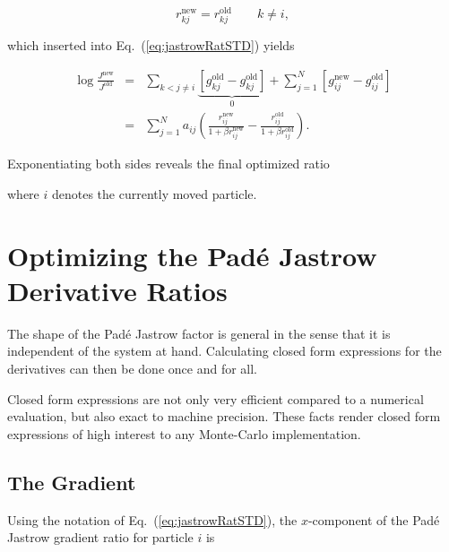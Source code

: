 \begin{equation}
 r^\mathrm{new}_{kj} = r^\mathrm{old}_{kj} \qquad k \ne i, 
\end{equation}

which inserted into Eq.~(\ref{eq:jastrowRatSTD}) yields

\begin{eqnarray}
  \log\frac{J^\mathrm{new}}{J^\mathrm{old}} &=& \sum_{k<j \ne i}  \underbrace{\left[g^\mathrm{old}_{kj} - g^\mathrm{old}_{kj}\right]}_{0} + \sum_{j = 1}^N \left[ g^\mathrm{new}_{ij} - g^\mathrm{old}_{ij}\right] \nonumber\\
                                            &=& \sum_{j = 1}^N a_{ij}\left(\frac{r^\mathrm{new}_{ij}}{1 + \beta r^\mathrm{new}_{ij}} - \frac{r^\mathrm{old}_{ij}}{1 + \beta r^\mathrm{old}_{ij}}\right).
\end{eqnarray}

Exponentiating both sides reveals the final optimized ratio 


where $i$ denotes the currently moved particle.

\section{Optimizing the Padé Jastrow Derivative Ratios}


The shape of the Padé Jastrow factor is general in the sense that it is independent of the system at hand. Calculating closed form expressions for the derivatives can then be done once and for all. 

Closed form expressions are not only very efficient compared to a numerical evaluation, but also exact to machine precision. These facts render closed form expressions of high interest to any Monte-Carlo implementation. 

\subsection{The Gradient}

Using the notation of Eq.~(\ref{eq:jastrowRatSTD}), the $x$-component of the Padé Jastrow gradient ratio for particle $i$ is

